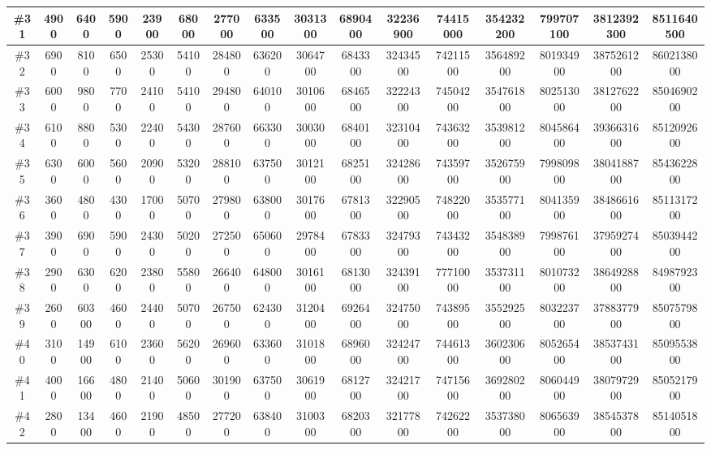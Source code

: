 \documentclass[titlepage]{article}
\begin{document}
\begin{landscape}
\begin{table}
\begin{tabular}{|c|c|c|c|c|c|c|c|c|c|c|c|c|c|c|c|}
				\hline
				\#31     & 4900   & 6400  & 5900  & 23900 & 68000 & 277000 & 633500 & 3031300 & 6890400 & 32236900 & 74415000 & 354232200 & 799707100 & 3812392300 & 8511640500  \\ 
				\hline
				\#32     & 6900   & 8100  & 6500  & 25300 & 54100 & 284800 & 636200 & 3064700 & 6843300 & 32434500 & 74211500 & 356489200 & 801934900 & 3875261200 & 8602138000  \\ 
				\hline
				\#33     & 6000   & 9800  & 7700  & 24100 & 54100 & 294800 & 640100 & 3010600 & 6846500 & 32224300 & 74504200 & 354761800 & 802513000 & 3812762200 & 8504690200  \\ 
				\hline
				\#34     & 6100   & 8800  & 5300  & 22400 & 54300 & 287600 & 663300 & 3003000 & 6840100 & 32310400 & 74363200 & 353981200 & 804586400 & 3936631600 & 8512092600  \\ 
				\hline
				\#35     & 6300   & 6000  & 5600  & 20900 & 53200 & 288100 & 637500 & 3012100 & 6825100 & 32428600 & 74359700 & 352675900 & 799809800 & 3804188700 & 8543622800  \\ 
				\hline
				\#36     & 3600   & 4800  & 4300  & 17000 & 50700 & 279800 & 638000 & 3017600 & 6781300 & 32290500 & 74822000 & 353577100 & 804135900 & 3848661600 & 8511317200  \\ 
				\hline
				\#37     & 3900   & 6900  & 5900  & 24300 & 50200 & 272500 & 650600 & 2978400 & 6783300 & 32479300 & 74343200 & 354838900 & 799876100 & 3795927400 & 8503944200  \\ 
				\hline
				\#38     & 2900   & 6300  & 6200  & 23800 & 55800 & 266400 & 648000 & 3016100 & 6813000 & 32439100 & 77710000 & 353731100 & 801073200 & 3864928800 & 8498792300  \\ 
				\hline
				\#39     & 2600   & 60300 & 4600  & 24400 & 50700 & 267500 & 624300 & 3120400 & 6926400 & 32475000 & 74389500 & 355292500 & 803223700 & 3788377900 & 8507579800  \\ 
				\hline
				\#40     & 3100   & 14900 & 6100  & 23600 & 56200 & 269600 & 633600 & 3101800 & 6896000 & 32424700 & 74461300 & 360230600 & 805265400 & 3853743100 & 8509553800  \\ 
				\hline
				\#41     & 4000   & 16600 & 4800  & 21400 & 50600 & 301900 & 637500 & 3061900 & 6812700 & 32421700 & 74715600 & 369280200 & 806044900 & 3807972900 & 8505217900  \\ 
				\hline
				\#42     & 2800   & 13400 & 4600  & 21900 & 48500 & 277200 & 638400 & 3100300 & 6820300 & 32177800 & 74262200 & 353738000 & 806563900 & 3854537800 & 8514051800  \\ 

\end{tabular}
\end{table}
\end{landscape}
\end{document}
